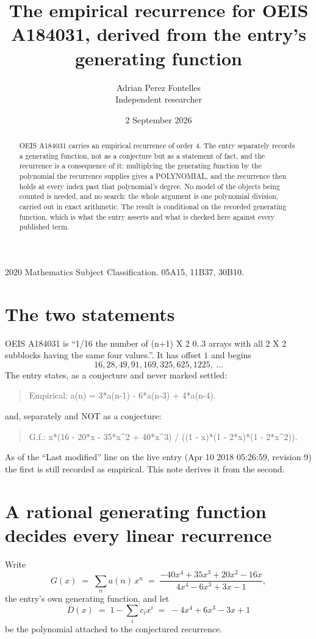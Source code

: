 \documentclass[11pt,a4paper]{article}
\title{The empirical recurrence for OEIS A184031, derived from the entry's generating function}
\author{Adrian Perez Fontelles\\ \small Independent researcher}
\date{2 September 2026}
\theoremstyle{plain}
\theoremstyle{definition}
\begin{document}
\maketitle

\begin{abstract}
OEIS A184031 carries an empirical recurrence of order $4$. The entry separately records a
generating function, not as a conjecture but as a statement of fact, and the recurrence is a
consequence of it: multiplying the generating function by the polynomial the recurrence
supplies gives a POLYNOMIAL, and the recurrence then holds at every index past that
polynomial's degree. No model of the objects being counted is needed, and no search: the
whole argument is one polynomial division, carried out in exact arithmetic. The result is
conditional on the recorded generating function, which is what the entry asserts and what is
checked here against every published term.
\end{abstract}

\noindent\small 2020 Mathematics Subject Classification. 05A15, 11B37, 30B10.\normalsize

\section{The two statements}

OEIS A184031 is ``1/16 the number of (n+1) X 2 0..3 arrays with all 2 X 2 subblocks having the same four values.''. It has offset $1$ and begins
\[
16, 28, 49, 91, 169, 325, 625, 1225,\ \dots
\]
The entry states, as a conjecture and never marked settled:
\begin{quote}
Empirical: a(n) = 3*a(n-1) - 6*a(n-3) + 4*a(n-4).
\end{quote}
and, separately and NOT as a conjecture:
\begin{quote}
G.f.: x*(16 - 20*x - 35*x\^{}2 + 40*x\^{}3) / ((1 - x)*(1 - 2*x)*(1 - 2*x\^{}2)).
\end{quote}
As of the ``Last modified'' line on the live entry (Apr 10 2018 05:26:59, revision 9) the first is still
recorded as empirical. This note derives it from the second.

\section{A rational generating function decides every linear recurrence}

Write
\[
G(x)\;=\;\sum_{n}a(n)\,x^{n}\;=\;\frac{- 40 x^{4} + 35 x^{3} + 20 x^{2} - 16 x}{4 x^{4} - 6 x^{3} + 3 x - 1},
\]
the entry's own generating function, and let
\[
D(x)\;=\;1-\sum_i c_i x^{i}\;=\;- 4 x^{4} + 6 x^{3} - 3 x + 1
\]
be the polynomial attached to the conjectured recurrence.
\end{document}
